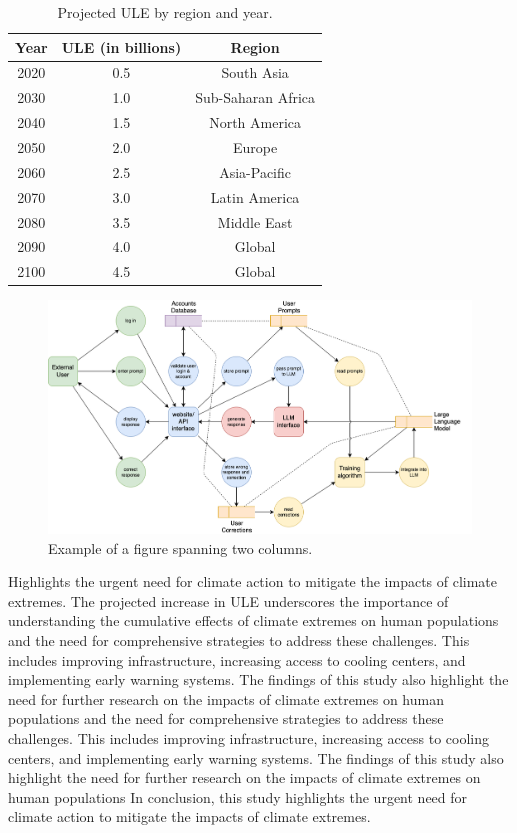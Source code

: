\documentclass[9pt, twoside, twocolumn]{extarticle}
\begin{document}
\begin{table}
    \centering
    \begin{tabular}{|c|c|c|}
        \hline
        Year & ULE (in billions) & Region \\
        \hline
        2020 & 0.5 & South Asia \\
        2030 & 1.0 & Sub-Saharan Africa \\
        2040 & 1.5 & North America \\
        2050 & 2.0 & Europe \\
        2060 & 2.5 & Asia-Pacific \\
        2070 & 3.0 & Latin America \\
        2080 & 3.5 & Middle East \\
        2090 & 4.0 & Global \\
        2100 & 4.5 & Global \\
        \hline
    \end{tabular}
    \caption{Projected ULE by region and year.}
    \label{tab:ule}
\end{table}
\begin{figure}
    \centering
    \includegraphics[width=\textwidth]{diagram-2.png}
    \caption{Example of a figure spanning two columns.}
    \label{fig:example-full}
\end{figure}

Highlights the urgent need for climate action to mitigate the impacts of climate extremes. The projected increase in ULE underscores the importance of understanding the cumulative effects of climate extremes on human populations and the need for comprehensive strategies to address these challenges. This includes improving infrastructure, increasing access to cooling centers, and implementing early warning systems.\cite{IPCC2021} The findings of this study also highlight the need for further research on the impacts of climate extremes on human populations and the need for comprehensive strategies to address these challenges. This includes improving infrastructure, increasing access to cooling centers, and implementing early warning systems.\cite{IPCC2021} The findings of this study also highlight the need for further research on the impacts of climate extremes on human populations  In conclusion, this study highlights the urgent need for climate action to mitigate the impacts of climate extremes. 
\end{document}
